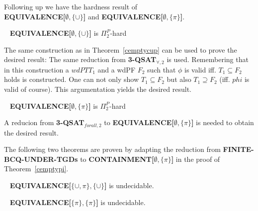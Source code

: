 Following up we have the hardness result of\\
\textbf{EQUIVALENCE[$\emptyset,\{\cup\}$]} and
\textbf{EQUIVALENCE[$\emptyset,\{\pi\}$]}.
\begin{theorem}~\cite{pichler2014containment}
	\textbf{EQUIVALENCE[$\emptyset,\{\cup\}$]} is $\Pi_2^P$-hard
\end{theorem}
\begin{proofidea}
The same construction as in Theorem~\ref{cemptycup} can be used to prove the
desired result: The same reduction from \textbf{3-QSAT$_{\forall,2}$} is used.
Remembering that in this construction a $wdPT T_1$ and a wdPF $F_2$ such that
$\phi$ is valid iff.  $T_1 \subseteq F_2$ holds is constructed.
One can
not only show $T_1 \subseteq F_2$ but also $T_1 \supseteq F_2$ (iff. $phi$ is
valid of course). This
argumentation yields the desired result.
\end{proofidea}

\begin{theorem}~\cite{pichler2014containment}
	\textbf{EQUIVALENCE[$\emptyset,\{\pi\}$]} is $\Pi_2^P$-hard
\end{theorem}
\begin{proofidea}
	A reducion from \textbf{3-QSAT$_{forall,2}$} to
	\textbf{EQUIVALENCE[$\emptyset,\{\pi\}$]}
is needed to obtain the desired result.
\end{proofidea}

The following two theorems are proven by adapting the reduction from
\textbf{FINITE-BCQ-UNDER-TGDs} to \textbf{CONTAINMENT[$\emptyset,\{\pi\}$]} in the proof of 
Theorem~\ref{cemptypi}.
\begin{theorem}~\cite{pichler2014containment}
	\textbf{EQUIVALENCE[$\{\cup,\pi\},\{\cup\}$]} is undecidable.
\end{theorem}
\begin{theorem}~\cite{pichler2014containment}
	\textbf{EQUIVALENCE[$\{\pi\},\{\pi\}$]} is undecidable.
\end{theorem}
